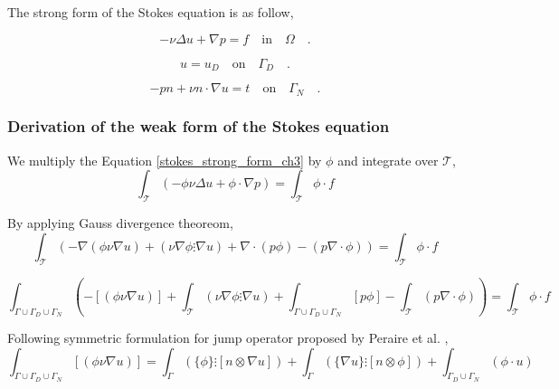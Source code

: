 \documentclass[a4paper,openany]{book}
\begin{document}
The strong form of the Stokes equation is as follow,

\begin{equation} \label{stokes_strong_form_ch3}
-\nu \Delta u + \nabla p = f \quad \textrm{in} \quad \Omega \quad \textrm{.}
\end{equation}

\begin{equation} \label{dirichlet condition stokes_ch3}
u = u_D \quad \textrm{on} \quad \Gamma_D \quad \textrm{.}
\end{equation}

\begin{equation} \label{neumann condition stokes_ch3}
-pn + \nu n \cdot \nabla u = t \quad \textrm{on} \quad \Gamma_N \quad \textrm{.}
\end{equation}


\subsubsection{Derivation of the weak form of the Stokes equation} \label{derivation_weak_stokes}

We multiply the Equation \ref{stokes_strong_form_ch3} by $\phi$ and integrate over $\mathcal{T}$,
\begin{equation}
\int_{\mathcal{T}} (- \phi \nu \Delta u + \phi \cdot \nabla p) = \int_{\mathcal{T}} \phi \cdot f 
\end{equation}

By applying Gauss divergence theoreom,
\begin{equation}
\int_{\mathcal{T}} (-\nabla (\phi \nu \nabla u) + (\nu \nabla \phi \vdots \nabla u) + \nabla \cdot (p \phi) - (p \nabla \cdot \phi)) = \int_{\mathcal{T}} \phi \cdot f 
\end{equation}

\begin{equation}
\int_{\Gamma \cup \Gamma_D \cup \Gamma_N} (- [(\phi \nu \nabla u)] + \int_{\mathcal{T}}  (\nu \nabla \phi \vdots \nabla u) + \int_{\Gamma \cup \Gamma_D \cup \Gamma_N}  [p \phi] - \int_{\mathcal{T}}  (p \nabla \cdot \phi)) = \int_{\mathcal{T}} \phi \cdot f 
\end{equation}

Following symmetric formulation for jump operator proposed by Peraire et al. \cite{peraire},
\begin{equation}
\int_{\Gamma \cup \Gamma_D \cup \Gamma_N} [(\phi \nu \nabla u)] = \int_{\Gamma} (\lbrace \phi \rbrace \vdots [n \otimes \nabla u]) + \int_{\Gamma} (\lbrace \nabla u \rbrace \vdots [n \otimes \phi]) + \int_{\Gamma_D \cup \Gamma_N} (\phi \cdot u ) 
\end{equation}
\end{document}
